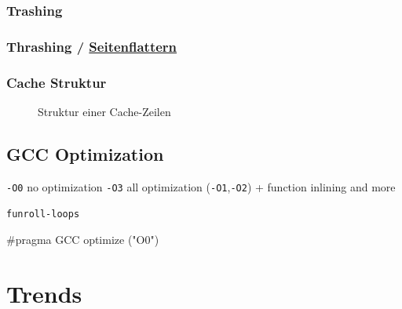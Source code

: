 \documentclass[
  10pt,
  a4paper,
  twocolumn]{article}
\newenvironment{Shaded}{}{}
\newcommand{\PreprocessorTok}[1]{\textcolor[rgb]{0.84,0.23,0.29}{#1}}
\begin{document}
\subsubsection{Trashing}\label{trashing}

\subsubsection{\texorpdfstring{Thrashing /
\href{https://de.wikipedia.org/wiki/Seitenflattern}{Seitenflattern}}{Thrashing / Seitenflattern}}\label{thrashing-seitenflattern}

\subsubsection{Cache Struktur}\label{cache-struktur}

\begin{figure}[H]


\caption{\label{fig-performance-cache-line-structure}Struktur einer
Cache-Zeilen}

\end{figure}%

\subsection{GCC Optimization}\label{gcc-optimization}

\texttt{-O0} no optimization \texttt{-O3} all optimization
(\texttt{-O1},\texttt{-O2}) + function inlining and more

\texttt{funroll-loops}

\begin{tcolorbox}[enhanced jigsaw, colback=white, leftrule=.75mm, rightrule=.15mm, bottomrule=.15mm, toprule=.15mm, colbacktitle=quarto-callout-tip-color!10!white, breakable, opacityback=0, bottomtitle=1mm, titlerule=0mm, toptitle=1mm, title=\textcolor{quarto-callout-tip-color}{\faLightbulb}\hspace{0.5em}{Enabling Optimization}, coltitle=black, arc=.35mm, left=2mm, colframe=quarto-callout-tip-color-frame, opacitybacktitle=0.6]

\begin{Shaded}
\begin{Highlighting}[]
\PreprocessorTok{\#pragma GCC optimize ("O0")}
\end{Highlighting}
\end{Shaded}

\end{tcolorbox}

\subsection{}\label{section}

\section{Trends}\label{trends}
\end{document}
